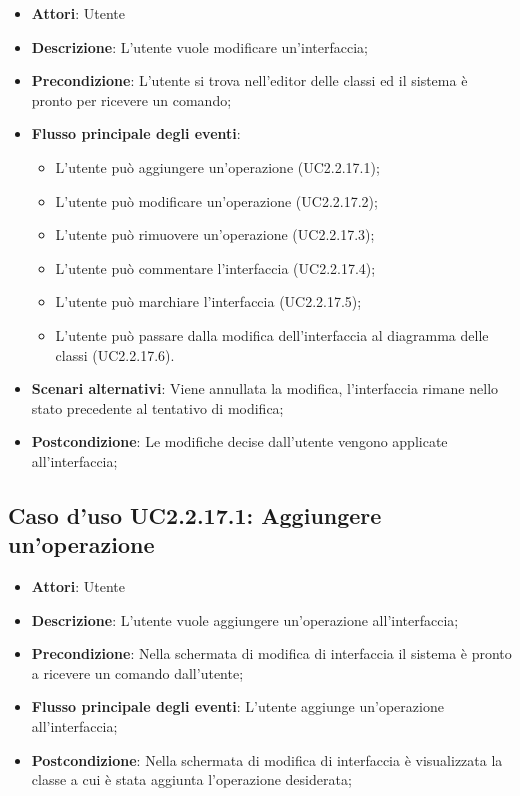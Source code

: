 \documentclass[../AnalisiDeiRequisiti.tex]{subfiles}
\begin{document}
			\begin{itemize}
				\item \textbf{Attori}: Utente
				\item \textbf{Descrizione}: L'utente vuole modificare un'interfaccia;
				\item \textbf{Precondizione}: L'utente si trova nell'editor delle classi ed il sistema è pronto per ricevere un comando;
				\item \textbf{Flusso principale degli eventi}: \begin{itemize}
					\item L'utente può aggiungere un'operazione (UC2.2.17.1);
					\item L'utente può modificare un'operazione (UC2.2.17.2);
					\item L'utente può rimuovere un'operazione (UC2.2.17.3);
					\item L'utente può commentare l'interfaccia (UC2.2.17.4);
					\item L'utente può marchiare l'interfaccia (UC2.2.17.5);
					\item L'utente può passare dalla modifica dell'interfaccia al diagramma delle classi (UC2.2.17.6).
				\end{itemize}
					\item \textbf{Scenari alternativi}: Viene annullata la modifica, l'interfaccia rimane nello stato precedente al tentativo di modifica;
					\item \textbf{Postcondizione}: Le modifiche decise dall'utente vengono applicate all'interfaccia;
				\end{itemize}
				\subsection{Caso d'uso UC2.2.17.1: Aggiungere un'operazione}
				\begin{itemize}
					\item \textbf{Attori}: Utente
					\item \textbf{Descrizione}: L'utente vuole aggiungere un'operazione all'interfaccia;
					\item \textbf{Precondizione}: Nella schermata di modifica di interfaccia il sistema è pronto a ricevere un comando dall'utente;
					\item \textbf{Flusso principale degli eventi}: L'utente aggiunge un'operazione all'interfaccia;
					\item \textbf{Postcondizione}: Nella schermata di modifica di interfaccia è visualizzata la classe a cui è stata aggiunta l'operazione desiderata;
				\end{itemize}
\end{document}

